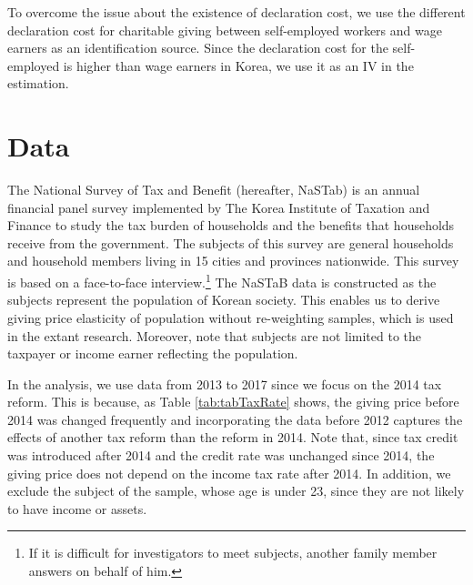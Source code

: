 \documentclass[
  11pt,
  a4paper,
]{article}
\begin{document}
To overcome the issue about the existence of declaration cost, we use the different declaration cost for charitable giving between self-employed workers and wage earners as an identification source. Since the declaration cost for the self-employed is higher than wage earners in Korea, we use it as an IV in the estimation.

\hypertarget{data}{%
\section{Data}\label{data}}

The National Survey of Tax and Benefit (hereafter, NaSTab) is
an annual financial panel survey
implemented by The Korea Institute of Taxation and Finance
to study the tax burden of households and the benefits
that households receive from the government.
The subjects of this survey are general households and
household members living in 15 cities and provinces nationwide.
This survey is based on a face-to-face interview.\footnote{If it is difficult for investigators to meet subjects, another family member answers on behalf of him.}
The NaSTaB data is constructed
as the subjects represent the population of Korean society.
This enables us to derive giving price elasticity of population
without re-weighting samples, which is used in the extant research.
Moreover, note that subjects are not limited to the taxpayer or
income earner reflecting the population.

In the analysis,
we use data from 2013 to 2017 since we focus on the 2014 tax reform.
This is because, as Table \ref{tab:tabTaxRate} shows,
the giving price before 2014 was changed frequently
and incorporating the data before 2012
captures the effects of another tax reform than the reform in 2014.
Note that, since tax credit was introduced after 2014 and
the credit rate was unchanged since 2014,
the giving price does not depend on the income tax rate after 2014.
In addition, we exclude the subject of the sample, whose age is under 23,
since they are not likely to have income or assets.
\end{document}

